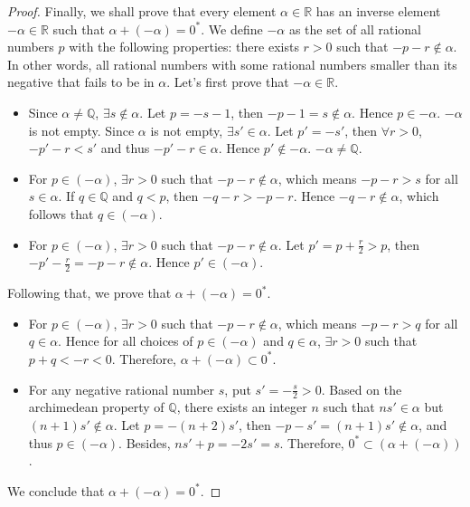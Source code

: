 \documentclass{article}
\begin{document}
\begin{proof}
  Finally, we shall prove that every element $\alpha \in \mathbb{R}$ has an 
  inverse element $-\alpha \in \mathbb{R}$ such that $\alpha + (-\alpha) = 0^*$. 
  We define $-\alpha$ as the set of all rational numbers $p$ with the following 
  properties: there exists $r > 0$ such that $-p - r \notin \alpha$. In other 
  words, all rational numbers with some rational numbers smaller than its 
  negative that fails to be in $\alpha$. Let's first prove that 
  $-\alpha \in \mathbb{R}$.
  \begin{itemize}
    \item Since $\alpha \neq \mathbb{Q}$, $\exists s \notin \alpha$. Let 
    $p = -s - 1$, then $-p - 1 = s \notin \alpha$. Hence $p \in -\alpha$. 
    $-\alpha$ is not empty. Since $\alpha$ is not empty, $\exists s' \in \alpha$. 
    Let $p' = -s'$, then $\forall r > 0$, $-p' - r < s'$ and thus 
    $-p' - r \in \alpha$. Hence $p' \notin -\alpha$. $-\alpha \neq \mathbb{Q}$.
    \item For $p \in (-\alpha)$, $\exists r > 0$ such that $-p - r \notin \alpha$, 
    which means $-p - r > s$ for all $s \in \alpha$. If $q \in \mathbb{Q}$ and 
    $q < p$, then $-q - r > -p - r$. Hence $-q - r \notin \alpha$, which follows 
    that $q \in (-\alpha)$.
    \item  For $p \in (-\alpha)$, $\exists r > 0$ such that 
    $-p - r \notin \alpha$. Let $p' = p + \frac{r}{2} > p$, then 
    $-p' - \frac{r}{2} = -p - r \notin \alpha$. Hence $p' \in (-\alpha)$.
  \end{itemize}
  Following that, we prove that $\alpha + (-\alpha) = 0^*$.
  \begin{itemize}
    \item For $p \in (-\alpha)$, $\exists r > 0$ such that $-p - r \notin \alpha$, 
    which means $-p - r > q$ for all $q \in \alpha$. Hence for all choices of 
    $p \in (-\alpha)$ and $q \in \alpha$, $\exists r > 0$ such that 
    $p + q < -r < 0$. Therefore, $\alpha + (-\alpha) \subset 0^*$.
    \item For any negative rational number $s$, put $s' = -\frac{s}{2} > 0$. 
    Based on the archimedean property of $\mathbb{Q}$, there exists an integer 
    $n$ such that $ns' \in \alpha$ but $(n+1)s' \notin \alpha$. Let 
    $p = -(n+2)s'$, then $-p - s' = (n+1)s' \notin \alpha$, and thus 
    $p \in (-\alpha)$. Besides, $ns' + p = -2s' = s$. Therefore, 
    $0^* \subset (\alpha + (-\alpha))$.
  \end{itemize}
  We conclude that $\alpha + (-\alpha) = 0^*$.
\end{proof}
\end{document}
